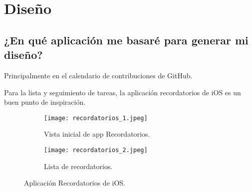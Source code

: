 \documentclass[11pt]{scrartcl} %
\begin{document}
\pagebreak

\section{Diseño}

\subsection{¿En qué aplicación me basaré para generar mi diseño?}

Principalmente en el calendario de contribuciones de GitHub.

Para la lista y seguimiento de tareas, la aplicación recordatorios de iOS es un buen punto de inspiración.

\begin{figure}[h]
\centering
\begin{subfigure}{.5\textwidth}
  \centering
  \texttt{[image: recordatorios\_1.jpeg]}
  \caption{Vista inicial de app Recordatorios.}
  \label{fig:sub1}
\end{subfigure}%
\begin{subfigure}{.5\textwidth}
  \centering
  \texttt{[image: recordatorios\_2.jpeg]}
  \caption{Lista de recordatorios.}
  \label{fig:sub2}
\end{subfigure}
\caption{Aplicación Recordatorios de iOS.}
\label{fig:test}
\end{figure}
\end{document}
